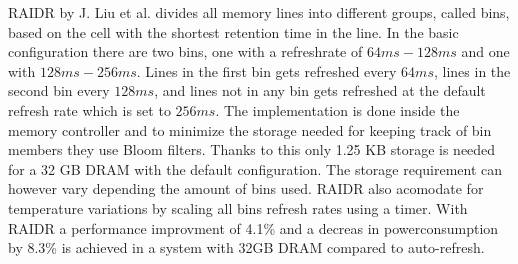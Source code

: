 RAIDR by J. Liu et al. \cite{raidr} divides all memory lines into different groups, called bins, based on the cell with the shortest retention time in the line. In the basic configuration there are two bins, one with a refreshrate of \(64ms - 128ms\) and one with \(128ms - 256ms\). Lines in the first bin gets refreshed every \(64ms\), lines in the second bin every \(128ms\), and lines not in any bin gets refreshed at the default refresh rate which is set to \(256ms\). The implementation is done inside the memory controller and to minimize the storage needed for keeping track of bin members they use Bloom filters. Thanks to this only 1.25 KB storage is needed for a 32 GB DRAM with the default configuration. The storage requirement can however vary depending the amount of bins used. RAIDR also acomodate for temperature variations by scaling all bins refresh rates using a timer. With RAIDR a performance improvment of 4.1\% and a decreas in powerconsumption by 8.3\% is achieved in a system with 32GB DRAM compared to auto-refresh.